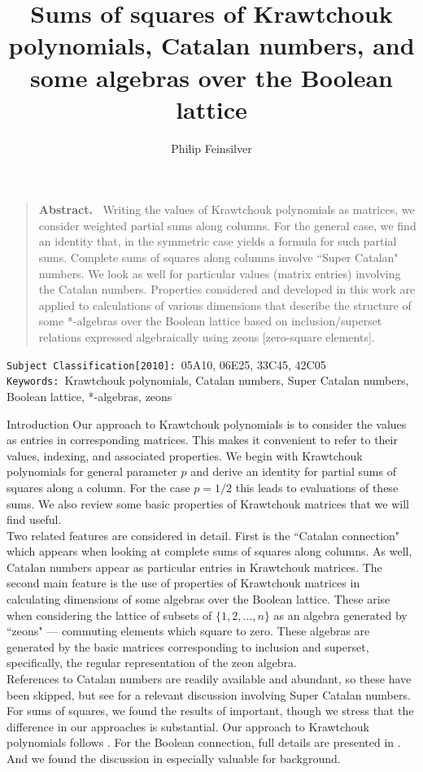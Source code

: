 \documentclass[12pt,reqno]{amsart}
\title[Sums of Squares for Krawtchouk]{Sums of squares of Krawtchouk polynomials, Catalan numbers, and some algebras over the Boolean lattice}
\author{Philip Feinsilver}
\renewenvironment{abstract}{\begin{quote}{\bf Abstract.\ }\small}{\end{quote}\bigskip}
\begin{document}
\maketitle
\thispagestyle{empty}
\date{}
\begin{abstract}
Writing the values of Krawtchouk polynomials as matrices, we consider weighted partial sums along columns. For the general case, we find
an identity that, in the symmetric case yields a formula for such partial sums. Complete sums of squares along columns involve
``Super Catalan" numbers. We look as well for particular values (matrix entries) involving the Catalan numbers. Properties
considered and developed in this work are applied to calculations of various dimensions that describe the structure of
some *-algebras over the Boolean lattice based on inclusion/superset relations expressed algebraically using zeons [zero-square elements].
\end{abstract}
{\footnotesize
{\tt Subject Classification[2010]: }{05A10, 06E25, 33C45, 42C05}\\
{\tt Keywords: }{Krawtchouk polynomials, Catalan numbers, Super Catalan numbers, Boolean lattice, *-algebras, zeons}
}
\begin{section}{Introduction}
Our approach to Krawtchouk polynomials is to consider the values as entries in corresponding matrices.
This makes it convenient to refer to their values, indexing, and associated properties. We begin with Krawtchouk	polynomials
for general parameter $p$ and derive an identity for partial sums of squares along a column. For the case $p=1/2$ this 
leads to evaluations of these sums. We also review some basic properties of Krawtchouk matrices that we will find useful.\\

Two related features are considered in detail. First is the ``Catalan connection" which appears when looking at complete sums of squares along columns.
As well, Catalan numbers appear as particular entries in Krawtchouk matrices. The second main feature is the use
of properties of Krawtchouk matrices in calculating dimensions of some algebras over the Boolean lattice. These arise when considering
the lattice of subsets of $\{1,2,\ldots,n\}$ as an algebra generated by ``zeons" --- commuting elements which square to zero.
These algebras are generated by the basic matrices corresponding to inclusion and superset, specifically, 
the regular representation of the zeon algebra.\\

References to Catalan numbers are readily available and abundant, so these have been skipped, but see \cite{GMT} for a relevant discussion
involving Super Catalan numbers. For sums of squares, we found
the results of \cite{D1} important, though we stress that the difference in
our approaches is substantial. Our approach to Krawtchouk	
polynomials follows \cite{FF,FK1}. For the Boolean connection, full details are presented in \cite{F1}. And we found the discussion in
\cite{Sag} especially valuable for background.


\end{section}
\end{document}
